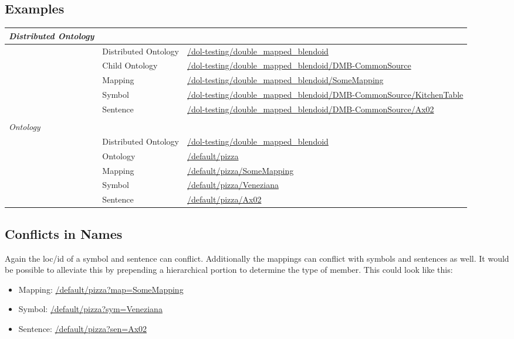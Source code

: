 \documentclass[a4paper,11pt,DIV=25]{scrartcl}
\begin{document}
\subsection{Examples}

\begin{tabularx}{\textwidth}{p{}p{}p{}}
  \textit{Distributed Ontology} & & \\
  \hline
  & Distributed Ontology & \url{/dol-testing/double_mapped_blendoid}\\
  & Child Ontology & \url{/dol-testing/double_mapped_blendoid/DMB-CommonSource}\\
  & Mapping & \url{/dol-testing/double_mapped_blendoid/SomeMapping}\\
  & Symbol & \url{/dol-testing/double_mapped_blendoid/DMB-CommonSource/KitchenTable}\\
  & Sentence & \url{/dol-testing/double_mapped_blendoid/DMB-CommonSource/Ax02}\\
  & & \\
  \textit{Ontology} & & \\
  \hline
  & Distributed Ontology & \url{/dol-testing/double_mapped_blendoid}\\
  & Ontology & \url{/default/pizza}\\
  & Mapping & \url{/default/pizza/SomeMapping}\\
  & Symbol & \url{/default/pizza/Veneziana}\\
  & Sentence & \url{/default/pizza/Ax02}\\
\end{tabularx}

\subsection{Conflicts in Names}

Again the loc/id of a symbol and sentence can conflict. Additionally the
mappings can conflict with symbols and sentences as well. It would be possible
to alleviate this by prepending a hierarchical portion to determine the type of
member. This could look like this:

\begin{itemize}
  \item Mapping: \url{/default/pizza?map=SomeMapping}
  \item Symbol: \url{/default/pizza?sym=Veneziana}
  \item Sentence: \url{/default/pizza?sen=Ax02}
\end{itemize}
\end{document}
